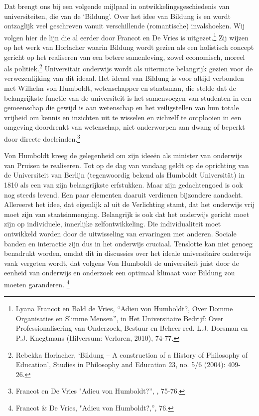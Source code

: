 \documentclass{jote-book}
\begin{document}
	Dat brengt ons bij een volgende mijlpaal in ontwikkelingsgeschiedenis van universiteiten, die van de ‘Bildung'. Over het idee van Bildung is en wordt ontzaglijk veel geschreven vanuit verschillende (romantische) invalshoeken. Wij volgen hier de lijn die al eerder door Francot en De Vries is uitgezet.\footnote{Lyana Francot en Bald de Vries, “Adieu von Humboldt?, Over Domme Organisaties en Slimme Mensen”, in Het Universitaire Bedrijf: Over Professionalisering van Onderzoek, Bestuur en Beheer red. L.J. Dorsman en P.J. Knegtmans (Hilversum: Verloren, 2010), 74-77.} Zij wijzen op het werk van Horlacher waarin Bildung wordt gezien als een holistisch concept gericht op het realiseren van een betere samenleving, zowel economisch, moreel als politiek.\footnote{Rebekka Horlacher, ‘Bildung -- A construction of a History of Philosophy of Education', Studies in Philosophy and Education 23, no. 5/6 (2004): 409-26.} Universitair onderwijs wordt als uitermate belangrijk gezien voor de verwezenlijking van dit ideaal. Het ideaal van Bildung is voor altijd verbonden met Wilhelm von Humboldt, wetenschapper en staatsman, die stelde dat de belangrijkste functie van de universiteit is het samenvoegen van studenten in een gemeenschap die gewijd is aan wetenschap en het veiligstellen van hun totale vrijheid om kennis en inzichten uit te wisselen en zichzelf te ontplooien in een omgeving doordrenkt van wetenschap, niet onderworpen aan dwang of beperkt door directe doeleinden.\footnote{Francot en De Vries "Adieu von Humboldt?”, , 75-76.}



	Von Humboldt kreeg de gelegenheid om zijn ideeën als minister van onderwijs van Pruisen te realiseren. Tot op de dag van vandaag geldt op de oprichting van de Universiteit van Berlijn (tegenwoordig bekend als Humboldt Universität) in 1810 als een van zijn belangrijkste erfstukken. Maar zijn gedachtengoed is ook nog steeds levend. Een paar elementen daaruit verdienen bijzondere aandacht. Allereerst het idee, dat eigenlijk al uit de Verlichting stamt, dat het onderwijs vrij moet zijn van staatsinmenging. Belangrijk is ook dat het onderwijs gericht moet zijn op individuele, innerlijke zelfontwikkeling. Die individualiteit moet ontwikkeld worden door de uitwisseling van ervaringen met anderen. Sociale banden en interactie zijn dus in het onderwijs cruciaal. Tenslotte kan niet genoeg benadrukt worden, omdat dit in discussies over het ideale universitaire onderwijs vaak vergeten wordt, dat volgens Von Humboldt de universiteit juist door de eenheid van onderwijs en onderzoek een optimaal klimaat voor Bildung zou moeten garanderen.\textsuperscript{ }\footnote{Francot \& De Vries, "Adieu von Humboldt?,”, 76.}
\end{document}
